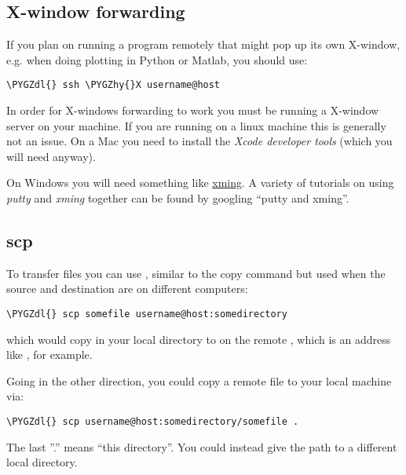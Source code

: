\documentclass[letterpaper,10pt,english]{sphinxmanual}
\def\PYGZdl{\char`\$}
\def\PYGZhy{\char`\-}
\begin{document}
\subsection{X-window forwarding}
\label{ssh:ssh-x}\label{ssh:x-window-forwarding}
If you plan on running a program remotely that might pop up its own
X-window, e.g. when doing plotting in Python or Matlab, you should use:

\begin{Verbatim}[commandchars=\\\{\}]
\PYGZdl{} ssh \PYGZhy{}X username@host
\end{Verbatim}

In order for X-windows forwarding to work you must be running
a X-window server on your machine.  If you are running on a linux machine
this is generally not an issue.  On a Mac you need to install the \emph{Xcode
developer tools} (which you will need anyway).

On Windows you will need something like \href{http://sourceforge.net/projects/xming/}{xming}.  A variety of tutorials on
using \emph{putty} and \emph{xming} together can be found by googling ``putty and
xming''.


\subsection{scp}
\label{ssh:scp}
To transfer files you can use , similar to the copy command  but used
when the source and destination are on different computers:

\begin{Verbatim}[commandchars=\\\{\}]
\PYGZdl{} scp somefile username@host:somedirectory
\end{Verbatim}

which would copy  in your local directory to 
on the remote , which is an address like ,
for example.

Going  in the other direction, you could copy a remote file to your local
machine via:

\begin{Verbatim}[commandchars=\\\{\}]
\PYGZdl{} scp username@host:somedirectory/somefile .
\end{Verbatim}

The last ''.'' means ``this directory''.  You could instead give the path to a
different local directory.
\end{document}
